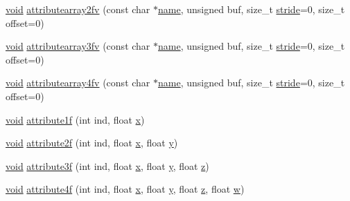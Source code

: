 \begin{DoxyCompactItemize}
\item 
\hyperlink{namespacetrimesh_a784ddfd979e1c579bda795a8edfc3f43}{void} \hyperlink{classtrimesh_1_1GLManager_a29caf422aaf3449fc08b4699239a4743}{attributearray2fv} (const char $\ast$\hyperlink{namespacetrimesh_a7f24cdcfa73387d7fa6aa44676238a79}{name}, unsigned buf, size\+\_\+t \hyperlink{namespacetrimesh_adbcc86014e77656be1a9df7ecaae5f2f}{stride}=0, size\+\_\+t offset=0)
\item 
\hyperlink{namespacetrimesh_a784ddfd979e1c579bda795a8edfc3f43}{void} \hyperlink{classtrimesh_1_1GLManager_a88119baf304c1506a78eb4b34faadb35}{attributearray3fv} (const char $\ast$\hyperlink{namespacetrimesh_a7f24cdcfa73387d7fa6aa44676238a79}{name}, unsigned buf, size\+\_\+t \hyperlink{namespacetrimesh_adbcc86014e77656be1a9df7ecaae5f2f}{stride}=0, size\+\_\+t offset=0)
\item 
\hyperlink{namespacetrimesh_a784ddfd979e1c579bda795a8edfc3f43}{void} \hyperlink{classtrimesh_1_1GLManager_af048fa094172473a9f8c150717cfc2f0}{attributearray4fv} (const char $\ast$\hyperlink{namespacetrimesh_a7f24cdcfa73387d7fa6aa44676238a79}{name}, unsigned buf, size\+\_\+t \hyperlink{namespacetrimesh_adbcc86014e77656be1a9df7ecaae5f2f}{stride}=0, size\+\_\+t offset=0)
\item 
\hyperlink{namespacetrimesh_a784ddfd979e1c579bda795a8edfc3f43}{void} \hyperlink{classtrimesh_1_1GLManager_ad5384d68b5d1b31e937829fb29e19077}{attribute1f} (int ind, float \hyperlink{namespacetrimesh_a3365d1b1a1bc5d8e9c844cf589a8c4a8}{x})
\item 
\hyperlink{namespacetrimesh_a784ddfd979e1c579bda795a8edfc3f43}{void} \hyperlink{classtrimesh_1_1GLManager_aa8cbc8d9edb029668a0c596f5de9e2e5}{attribute2f} (int ind, float \hyperlink{namespacetrimesh_a3365d1b1a1bc5d8e9c844cf589a8c4a8}{x}, float \hyperlink{namespacetrimesh_a56b35d0eb7039be92fcc4867080c7419}{y})
\item 
\hyperlink{namespacetrimesh_a784ddfd979e1c579bda795a8edfc3f43}{void} \hyperlink{classtrimesh_1_1GLManager_a294b73697cb14b57a814f6f57a6e7813}{attribute3f} (int ind, float \hyperlink{namespacetrimesh_a3365d1b1a1bc5d8e9c844cf589a8c4a8}{x}, float \hyperlink{namespacetrimesh_a56b35d0eb7039be92fcc4867080c7419}{y}, float \hyperlink{namespacetrimesh_a42d0d86cc8db1d2be48121fe5e52fc67}{z})
\item 
\hyperlink{namespacetrimesh_a784ddfd979e1c579bda795a8edfc3f43}{void} \hyperlink{classtrimesh_1_1GLManager_a02f45ce25a00bc3cb06209997c17bc33}{attribute4f} (int ind, float \hyperlink{namespacetrimesh_a3365d1b1a1bc5d8e9c844cf589a8c4a8}{x}, float \hyperlink{namespacetrimesh_a56b35d0eb7039be92fcc4867080c7419}{y}, float \hyperlink{namespacetrimesh_a42d0d86cc8db1d2be48121fe5e52fc67}{z}, float \hyperlink{namespacetrimesh_acd577db8a2f95fe39ececb95e98a6c71}{w})

\end{DoxyCompactItemize}
